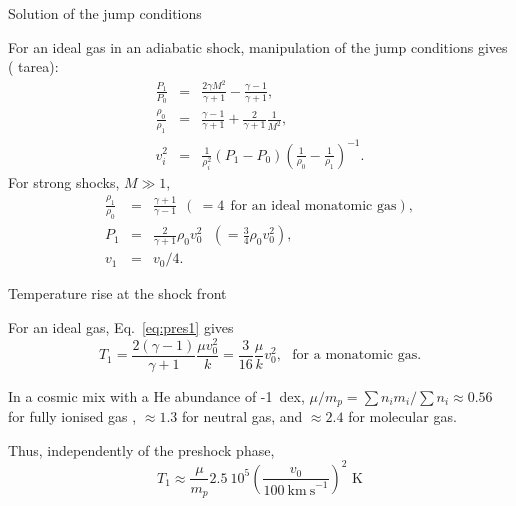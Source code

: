 \begin{frame}{Solution of the jump  conditions}

For an ideal gas in an adiabatic shock, manipulation of the jump
conditions gives ({\color{red} tarea}):
\begin{eqnarray}
\frac{P_1}{P_0} & = & \frac{2\gamma M^2}{\gamma + 1} - \frac{\gamma -
  1}{\gamma +1}, \\
\frac{\rho_0}{\rho_1} & = & \frac{\gamma -
  1}{\gamma +1} + \frac{2}{\gamma + 1} \frac{1}{M^2}, \label{eq:dens} \\ 
v_i^2  & = & \frac{1}{\rho_i^2} (P_1 - P_0) \left(\frac{1}{\rho_0} - \frac{1}{\rho_1}\right)^{-1}.  
\end{eqnarray}
For strong shocks, $M \gg 1$, 
\begin{eqnarray}
\frac{\rho_1}{\rho_0} & = & \frac{\gamma + 1 }{\gamma -1 } ~~(~= 4~~
\text{for an ideal monatomic gas}), \label{eq:Jshock1} \\
P_1 & = & \frac{2}{\gamma + 1} \rho_0 v_0^2 ~~~( = \frac{3}{4} \rho_0
v_0^2), \label{eq:pres1}\\ 
v_1 & = & v_0 /4. \label{eq:Jshock2}
\end{eqnarray}

\end{frame}





\begin{frame}{Temperature rise at the shock front}


For an ideal gas, Eq.~\ref{eq:pres1} gives 
\[T_1 = \frac{2 (\gamma - 1)
}{\gamma + 1} \frac{\mu v_0^2}{k} = \frac{3}{16} \frac{\mu}{k}
v_0^2,~~~{\text{for a monatomic gas}}.\] 


In a cosmic mix with a He abundance of -1~dex, $\mu / m_p = \sum n_i
m_i / \sum n_i \approx 0.56$ for fully ionised gas , $\approx 1.3$ for
neutral gas, and $\approx 2.4$ for molecular gas.


 Thus, independently
of the preshock phase,
\[ T_1 \approx \frac{\mu}{m_p} 2.5~10^{5} \left(
\frac{v_0}{100~\mathrm{km~s}^{-1}} \right)^2 \text{~K} \]


\end{frame}




